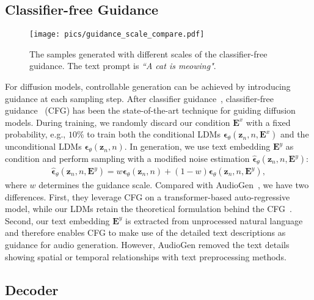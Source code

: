 \documentclass{article}
\begin{document}
\subsection{Classifier-free Guidance}
\label{CFG}

\begin{figure}[htbp]
    \centering
    \texttt{[image: pics/guidance\_scale\_compare.pdf]}
    \caption{The samples generated with different scales of the classifier-free guidance. The text prompt is \textit{``A cat is meowing"}.}
    \label{fig:my_label}
\end{figure}

For diffusion models, controllable generation can be achieved by introducing guidance at each sampling step. After classifier guidance~\cite{SGM,ImprovedDDPM}, classifier-free guidance~\cite{CFG,Glide} (CFG) has been the state-of-the-art technique for guiding diffusion models. During training, we randomly discard our condition $\boldsymbol{E}^{x}$ with a fixed probability, e.g., $10\%$ to train both the conditional LDMs $\boldsymbol{\epsilon}_{\theta}(\boldsymbol{z}_{n},n,\boldsymbol{E}^{x})$ and the unconditional LDMs $\boldsymbol{\epsilon}_{\theta}(\boldsymbol{z}_{n},n)$. In generation, we use text embedding $\boldsymbol{E}^{y}$ as condition and perform sampling with a modified noise estimation $\hat{\boldsymbol{\epsilon}}_{\theta}(\boldsymbol{z}_{n},n,\boldsymbol{E}^{y})$:
\begin{align}
\label{mixup}
\hat{\boldsymbol{\epsilon}}_{\theta}(\boldsymbol{z}_{n},n,\boldsymbol{E}^{y}) = w\boldsymbol{\epsilon}_{\theta}(\boldsymbol{z}_{n},n)+(1-w)\boldsymbol{\epsilon}_{\theta}(\boldsymbol{z}_{n},n,\boldsymbol{E}^{y}),
\end{align}
where $w$ determines the guidance scale.
Compared with AudioGen~\cite{kreuk2022audiogen}, we have two differences. First, they leverage CFG on a transformer-based auto-regressive model, while our LDMs retain the theoretical formulation behind the CFG~\cite{CFG}. Second, our text embedding $\boldsymbol{E}^{y}$ is extracted from unprocessed natural language and therefore enables CFG to make use of the detailed text descriptions as guidance for audio generation. However, AudioGen removed the text details showing spatial or temporal relationships with text preprocessing methods. 

\subsection{Decoder}
\label{Decoder}
\end{document}
